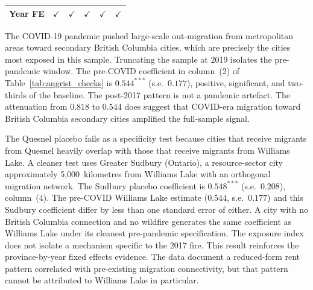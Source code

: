 \documentclass[12pt]{article}
\begin{document}
\begin{table}[tbp]
\begin{threeparttable}
{\begin{tabular}{lrrrrr}
      Year FE            & $\checkmark$  & $\checkmark$  & $\checkmark$  & $\checkmark$  & $\checkmark$ \\
      \bottomrule
    \end{tabular}}
  \end{threeparttable}
  \par\smallskip{}
\end{table}

The COVID-19 pandemic pushed large-scale out-migration from metropolitan areas
toward secondary British Columbia cities, which are precisely the cities most
exposed in this sample. Truncating the sample at 2019 isolates the pre-pandemic
window. The pre-COVID coefficient in column~(2) of Table~\ref{tab:angrist_checks}
is $0.544^{***}$ (s.e.\ $0.177$), positive, significant, and two-thirds of
the baseline. The post-2017 pattern is not a pandemic artefact. The attenuation from
$0.818$ to $0.544$ does suggest that COVID-era migration toward British Columbia
secondary cities amplified the full-sample signal.

The Quesnel placebo fails as a specificity test because cities that receive
migrants from Quesnel heavily overlap with those that receive migrants from Williams
Lake. A cleaner test uses Greater Sudbury (Ontario), a resource-sector city
approximately 5{,}000~kilometres from Williams Lake with an orthogonal migration
network. The Sudbury placebo coefficient is $0.548^{***}$ (s.e.\ $0.208$),
column~(4). The pre-COVID Williams Lake estimate ($0.544$, s.e.\ $0.177$) and this
Sudbury coefficient differ by less than one standard error of either. A city with
no British Columbia connection and no wildfire generates the same coefficient as
Williams Lake under its cleanest pre-pandemic specification. The exposure index
does not isolate a mechanism specific to the 2017 fire. This result reinforces the province-by-year fixed effects evidence. The data
document a reduced-form rent pattern correlated with pre-existing migration
connectivity, but that pattern cannot be attributed to Williams Lake in particular.
\end{document}

